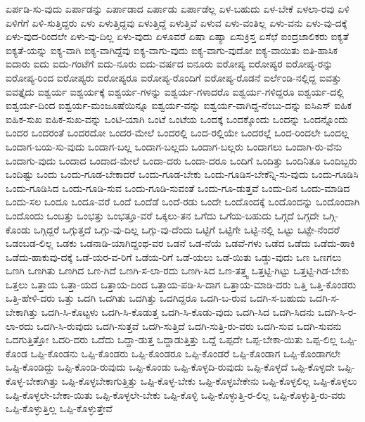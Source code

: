 {ಏರ್ಪಡಿ-ಸು-ವುದು
ಏರ್ಪಾಡನ್ನು
ಏರ್ಪಾಡಾದ
ಏರ್ಪಾಡು
ಏರ್ಪಾಡೆಲ್ಲ
ಏಳ-ಬಹುದು
ಏಳ-ಬೇಕೆ
ಏಳಲಾ-ರವು
ಏಳಿ
ಏಳಿಗೆಗೆ
ಏಳಿ-ಸುತ್ತಿದ್ದರು
ಏಳು
ಏಳುತ್ತಿದ್ದವು
ಏಳುತ್ತಿದ್ದೆ
ಏಳುತ್ತಿವೆ
ಏಳುವ
ಏಳು-ವಂತಿಲ್ಲ
ಏಳು-ವನು
ಏಳು-ವು-ದಕ್ಕೆ
ಏಳು-ವುದ-ರಿಂದಲೇ
ಏಳು-ವು-ದಿಲ್ಲ
ಏಳು-ವುದು
ಏಳೂವರೆ
ಏಷಾ
ಏಷ್ಯಾ
ಏಸುಕ್ರಿಸ್ತ
ಏಸೆಛೆ
ಐಂದ್ರಜಾಲಿಕರು
ಐಕ್ಯತೆ
ಐಕ್ಯತೆ-ಯನ್ನು
ಐಕ್ಯ-ವಾಗಿ
ಐಕ್ಯ-ವಾಗಿದ್ದೆವು
ಐಕ್ಯ-ವಾಗು-ವುದು
ಐಕ್ಯ-ವಾಗು-ವುದೋ
ಐಕ್ಯ-ವಾಯಿತು
ಐತಿ-ಹಾಸಿಕ
ಐದಾರು
ಐದು
ಐದು-ಗಂಟೆಗೆ
ಐದು-ನೂರು
ಐದು-ವರ್ಷದ
ಐನೂರು
ಐರೋಪ್ಯ
ಐರೋಪ್ಯರ
ಐರೋಪ್ಯ-ರನ್ನು
ಐರೋಪ್ಯ-ರಿಂದ
ಐರೋಪ್ಯರು
ಐರೋಪ್ಯರೂ
ಐರೋಪ್ಯ-ರೊಂದಿಗೆ
ಐರೋಪ್ಯ-ರೊಡನೆ
ಐರ್ಲೆಂಡಿ-ನಲ್ಲಿದ್ದ
ಐವತ್ತು
ಐವತ್ತೈದು
ಐಶ್ವರ್ಯ
ಐಶ್ವರ್ಯಕ್ಕೆ
ಐಶ್ವರ್ಯ-ಗಳನ್ನು
ಐಶ್ವರ್ಯ-ಗಳಾದರೊ
ಐಶ್ವರ್ಯ-ಗಳಿದ್ದರೂ
ಐಶ್ವರ್ಯ-ದಲ್ಲಿ
ಐಶ್ವರ್ಯ-ದಿಂದ
ಐಶ್ವರ್ಯ-ಮಂಜೂಷೆಯಿನ್ನೂ
ಐಶ್ವರ್ಯ-ವನ್ನು
ಐಶ್ವರ್ಯ-ವಾಗಿದ್ದ-ನೆಂಬು-ದನ್ನು
ಐಸಿಎಸ್
ಐಹಿಕ
ಐಹಿಕ-ಸುಖ
ಐಹಿಕ-ಸುಖ-ವನ್ನು
ಒಂಟಿ-ಯಾಗಿ
ಒಂಟೆ
ಒಂಟೆಯ
ಒಂದಕ್ಕೆ
ಒಂದಕ್ಕೊಂದು
ಒಂದನ್ನು
ಒಂದನ್ನೊಂದು
ಒಂದರ
ಒಂದರಂತೆ
ಒಂದರದೋ
ಒಂದರ-ಮೇಲೆ
ಒಂದರಲ್ಲಿ
ಒಂದ-ರಲ್ಲಿಯೇ
ಒಂದರಲ್ಲೆ
ಒಂದ-ರಿಂದಲೇ
ಒಂದಲ್ಲ
ಒಂದಾಗ-ಬಯ-ಸು-ವುದು
ಒಂದಾಗ-ಬಲ್ಲ
ಒಂದಾಗ-ಬಲ್ಲದು
ಒಂದಾಗ-ಬಲ್ಲರು
ಒಂದಾಗಲು
ಒಂದಾಗಿ-ರು-ವೆನು
ಒಂದಾಗು-ವುದು
ಒಂದಾದ
ಒಂದಾದ-ಮೇಲೆ
ಒಂದಾ-ದರು
ಒಂದಾ-ದರೂ
ಒಂದಿಗೆ
ಒಂದಿತ್ತು
ಒಂದಿನಿತೂ
ಒಂದಿಬ್ಬರು
ಒಂದಿಷ್ಟು
ಒಂದು
ಒಂದು-ಗೂಡ-ಬೇಕಾದರೆ
ಒಂದು-ಗೂಡ-ಬೇಕು
ಒಂದು-ಗೂಡಿಸ-ಬೇಕೆನ್ನಿ-ಸು-ವುದು
ಒಂದು-ಗೂಡಿಸಿ
ಒಂದು-ಗೂಡಿಸಿದ
ಒಂದು-ಗೂಡಿ-ಸುವ
ಒಂದು-ಗೂಡಿ-ಸುವಂತೆ
ಒಂದು-ಗೂ-ಡುತ್ತವೆ
ಒಂದು-ದಿನ
ಒಂದು-ಮಾಡಿದ
ಒಂದು-ಸಲ
ಒಂದೂ
ಒಂದೂ-ವರೆ
ಒಂದೆ
ಒಂದೆಡೆ
ಒಂದೆ-ರಡು
ಒಂದೇ
ಒಂದೊಂದಕ್ಕೆ
ಒಂದೊಂದನ್ನು
ಒಂದೊಂದಾಗಿ
ಒಂದೊಂದು
ಒಂಬತ್ತು
ಒಂಭತ್ತು
ಒಂಭತ್ತೂ-ವರೆ
ಒಕ್ಕಲು-ತನ
ಒಗೆದು
ಒಗೆಯ-ಬಹುದು
ಒಗ್ಗದೆ
ಒಗ್ಗದೇ
ಒಗ್ಗಿ-ಕೊಂಡು
ಒಗ್ಗಿದ್ದರೆ
ಒಗ್ಗುತ್ತದೆ
ಒಗ್ಗು-ವು-ದಿಲ್ಲ
ಒಗ್ಗು-ವು-ದೆಂದು
ಒಟ್ಟಿಗೆ
ಒಟ್ಟಿಗೇ
ಒಟ್ಟಿ-ನಲ್ಲಿ
ಒಟ್ಟು
ಒಟ್ಟೇ-ನೆಂದರೆ
ಒಡಂಬಡ-ಲಿಲ್ಲ
ಒಡಕು
ಒಡನಾಡಿ-ಯಾಗಿದ್ದಂಥ-ವರ
ಒಡನೆ
ಒಡ-ನೆಯೆ
ಒಡವೆ-ಗಳು
ಒಡೆದ
ಒಡೆದು
ಒಡೆದು-ಹಾಕಿ
ಒಡೆದು-ಹಾಕುವು-ದಕ್ಕೆ
ಒಡೆ-ಯರ-ವ-ರಿಗೆ
ಒಡೆಯ-ರಿಗೆ
ಒಡೆ-ಯಲು
ಒಡೆ-ಯಿತು
ಒಡ್ಡು-ವುದು
ಒಣ
ಒಣಗಲು
ಒಣಗಿ
ಒಣಗಿತು
ಒಣಗಿದ
ಒಣ-ಗಿದೆ
ಒಣಗಿ-ಸ-ಲಾ-ರದು
ಒಣಗಿ-ಸಿದ
ಒಣ-ತತ್ತ್ವ
ಒತ್ತಟ್ಟಿ-ಗಿಟ್ಟು
ಒತ್ತಟ್ಟಿ-ಗಿಡ-ಬೇಕು
ಒತ್ತಲು
ಒತ್ತಾಯ
ಒತ್ತಾ-ಯದ
ಒತ್ತಾಯ-ದಿಂದ
ಒತ್ತಾಯ-ಪಡಿ-ಸಿ-ದಾಗ
ಒತ್ತಾಯ-ಮಾಡಿ-ದರು
ಒತ್ತಿ
ಒತ್ತಿ-ಕೊಂಡರು
ಒತ್ತಿ-ಹೇಳಿ-ದರು
ಒತ್ತು
ಒದಗಿ
ಒದಗಿತು
ಒದಗಿತ್ತು
ಒದಗಿದ್ದರೂ
ಒದಗಿ-ಬ-ರುವ
ಒದಗಿ-ಸ-ಬಹುದು
ಒದಗಿ-ಸ-ಬೇಕಾಗಿತ್ತು
ಒದಗಿ-ಸಿ-ಕೊಟ್ಟಳು
ಒದಗಿ-ಸಿ-ಕೊಡುತ್ತ
ಒದಗಿ-ಸಿ-ಕೊಡು-ವುದು
ಒದಗಿ-ಸಿದ
ಒದಗಿ-ಸಿದನು
ಒದಗಿ-ಸಿ-ರ-ಲಾ-ರದು
ಒದಗಿ-ಸಿ-ರುವುದು
ಒದಗಿ-ಸುತ್ತವೆ
ಒದಗಿ-ಸುತ್ತಿದೆ
ಒದಗಿ-ಸುತ್ತಿ-ರು-ವರು
ಒದಗಿ-ಸುವ
ಒದಗಿ-ಸುವನು
ಒದಗುತ್ತಿತ್ತೋ
ಒದರಿ-ದರು
ಒದೆದು
ಒದ್ದಾ-ಡುತ್ತ
ಒದ್ದಾಡುತ್ತಿತ್ತು
ಒದ್ದೆ
ಒಪ್ಪದೇ
ಒಪ್ಪ-ಬೇಕಾ-ಯಿತು
ಒಪ್ಪ-ಲಿಲ್ಲ
ಒಪ್ಪಿ-ಕೊಂಡ
ಒಪ್ಪಿ-ಕೊಂಡನು
ಒಪ್ಪಿ-ಕೊಂಡರು
ಒಪ್ಪಿ-ಕೊಂಡರೂ
ಒಪ್ಪಿ-ಕೊಂಡರೆ
ಒಪ್ಪಿ-ಕೊಂಡಾಗ
ಒಪ್ಪಿ-ಕೊಂಡಾಗಲೇ
ಒಪ್ಪಿ-ಕೊಂಡಿದ್ದು
ಒಪ್ಪಿ-ಕೊಂಡಿ-ರುವುದು
ಒಪ್ಪಿ-ಕೊಂಡು
ಒಪ್ಪಿ-ಕೊಳ್ಳದಿ-ರುವುದು
ಒಪ್ಪಿ-ಕೊಳ್ಳದೆ
ಒಪ್ಪಿ-ಕೊಳ್ಳದೇ
ಒಪ್ಪಿ-ಕೊಳ್ಳ-ಬೇಕಾಗಿತ್ತು
ಒಪ್ಪಿ-ಕೊಳ್ಳಬೇಕಾಗುತ್ತಿತ್ತು
ಒಪ್ಪಿ-ಕೊಳ್ಳ-ಬೇಕು
ಒಪ್ಪಿ-ಕೊಳ್ಳಬೇಕೇನು
ಒಪ್ಪಿ-ಕೊಳ್ಳಲಿಲ್ಲ
ಒಪ್ಪಿ-ಕೊಳ್ಳಲು
ಒಪ್ಪಿ-ಕೊಳ್ಳಲೇ-ಬೇಕಾ-ಯಿತು
ಒಪ್ಪಿ-ಕೊಳ್ಳಲೇ-ಬೇಕು
ಒಪ್ಪಿ-ಕೊಳ್ಳಿ
ಒಪ್ಪಿ-ಕೊಳ್ಳುತ್ತಿ-ರ-ಲಿಲ್ಲ
ಒಪ್ಪಿ-ಕೊಳ್ಳುತ್ತಿ-ರು-ವರು
ಒಪ್ಪಿ-ಕೊಳ್ಳುತ್ತಿಲ್ಲ
ಒಪ್ಪಿ-ಕೊಳ್ಳುತ್ತೇವೆ
}
